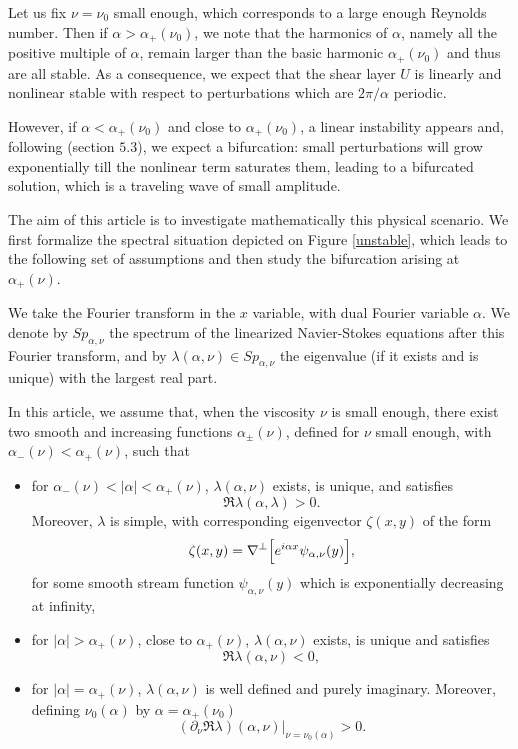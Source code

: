\documentclass[11pt]{article}
\begin{document}
Let us fix $\nu = \nu_0$ small enough, which corresponds to a large enough Reynolds number.
Then if $\alpha > \alpha_{+}(\nu_0)$, we note that the harmonics of $\alpha$, namely all the positive
multiple of $\alpha$, remain larger than the basic harmonic $\alpha_{+}(\nu_0)$ and thus are all stable.
As a consequence, we expect that the shear layer $U$ is linearly and nonlinear stable with respect
to perturbations which are $2 \pi / \alpha$ periodic.

However, if $\alpha < \alpha_{+}(\nu_0)$ and close to $\alpha_{+}(\nu_0)$, a linear instability appears
and, following \cite{Schmidt} (section $5.3$), we expect a bifurcation: small perturbations will
grow exponentially till the nonlinear term saturates them, leading to a bifurcated solution,
which is a traveling wave of small amplitude.

\medskip

The aim of this article is to investigate mathematically this physical scenario.
We first formalize the spectral situation depicted on Figure \ref{unstable},
which leads to the following set of assumptions and then study the bifurcation arising at 
$\alpha_+(\nu)$.

\medskip

We take the Fourier transform in the
$x$ variable, with dual Fourier variable $\alpha$. We denote by $Sp_{\alpha,\nu}$ the
spectrum of the linearized Navier-Stokes equations after this Fourier transform, and by
$\lambda(\alpha,\nu) \in Sp_{\alpha,\nu}$ the eigenvalue (if it exists and is unique) with the largest real part.

In this article, we assume that, 
when the viscosity $\nu$ is small enough,
there exist two smooth and increasing functions $\alpha_\pm(\nu)$, 
defined for $\nu$ small enough, with $\alpha_-(\nu) < \alpha_+(\nu)$, such that

\begin{itemize}

\item[(A1)] for $\alpha_-(\nu) < |\alpha| < \alpha_+(\nu)$, $\lambda(\alpha,\nu)$ exists, is unique,
and satisfies $$
\Re \lambda(\alpha, \lambda) > 0. 
$$
Moreover, $\lambda$ is simple, with corresponding  eigenvector $\zeta(x,y)$ of the form
$$
\zeta(x,y) = \nabla^{\perp} \Bigl[ e^{i \alpha x} \psi_{\alpha,\nu}(y) \Bigr],
$$
for some smooth stream function $\psi_{\alpha,\nu}(y)$ which is exponentially decreasing at infinity,

\item[(A2)] for $|\alpha| > \alpha_+(\nu)$, close to $\alpha_+(\nu)$,
$\lambda(\alpha,\nu)$ exists, is unique and satisfies
$$
\Re \lambda(\alpha,\nu) < 0,
$$

\item[(A3)] for $| \alpha | = \alpha_+(\nu)$, $\lambda(\alpha,\nu)$ is well defined and purely imaginary.
Moreover, defining $\nu_0(\alpha)$ by $\alpha=\alpha_+(\nu_0)$
$$
(\partial_\nu \Re \lambda) (\alpha,\nu) |_{\nu = \nu_0(\alpha)} > 0.
$$
\end{itemize}
\end{document}
